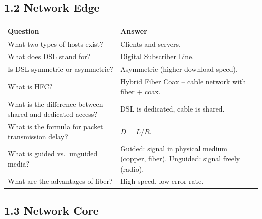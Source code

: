 \subsection{1.2 Network Edge}

\begin{exambox}
\begin{longtable}{p{6.5cm}p{7cm}}
\toprule
\textbf{Question} & \textbf{Answer} \\
\midrule
\endhead
What two types of hosts exist? & Clients and servers. \\
\midrule
What does DSL stand for? & Digital Subscriber Line. \\
\midrule
Is DSL symmetric or asymmetric? & Asymmetric (higher download speed). \\
\midrule
What is HFC? & Hybrid Fiber Coax -- cable network with fiber + coax. \\
\midrule
What is the difference between shared and dedicated access? & DSL is dedicated, cable is shared. \\
\midrule
What is the formula for packet transmission delay? & $D = L / R$. \\
\midrule
What is guided vs.\ unguided media? & Guided: signal in physical medium (copper, fiber). Unguided: signal freely (radio). \\
\midrule
What are the advantages of fiber? & High speed, low error rate. \\
\bottomrule
\end{longtable}
\end{exambox}

\subsection{1.3 Network Core}

